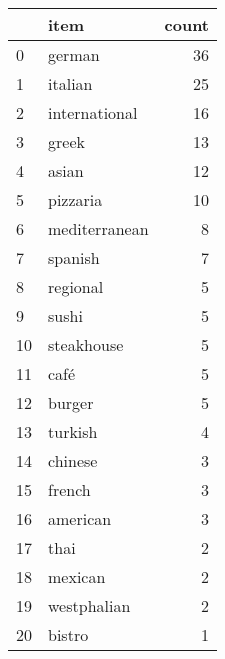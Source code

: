 \begin{tabular}{llr}
\toprule
{} &              item &  count \\
\midrule
0  &            german &     36 \\
1  &           italian &     25 \\
2  &     international &     16 \\
3  &             greek &     13 \\
4  &             asian &     12 \\
5  &          pizzaria &     10 \\
6  &     mediterranean &      8 \\
7  &           spanish &      7 \\
8  &          regional &      5 \\
9  &             sushi &      5 \\
10 &        steakhouse &      5 \\
11 &              café &      5 \\
12 &            burger &      5 \\
13 &           turkish &      4 \\
14 &           chinese &      3 \\
15 &            french &      3 \\
16 &          american &      3 \\
17 &              thai &      2 \\
18 &           mexican &      2 \\
19 &       westphalian &      2 \\
20 &            bistro &      1 \\
\bottomrule
\end{tabular}
